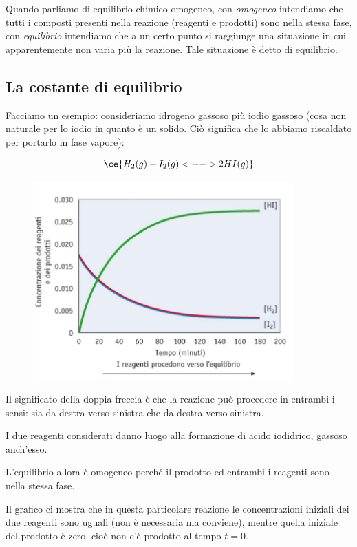 Quando parliamo di equilibrio chimico omogeneo, con \textit{omogeneo} intendiamo che tutti i composti presenti nella reazione (reagenti e prodotti) sono nella stessa fase, con \textit{equilibrio} intendiamo che a un certo punto si raggiunge una situazione in cui apparentemente non varia più la reazione. Tale situazione è detto di equilibrio.
\subsection{La costante di equilibrio}
\vspace{0.2cm}Facciamo un esempio: consideriamo idrogeno gassoso più iodio gassoso (cosa non naturale per lo iodio in quanto è un solido. Ciò significa che lo abbiamo riscaldato per portarlo in fase vapore):

$$\ce{H_2(g) + I_2(g) <--> 2HI(g)}$$
\vspace{-1cm}\begin{figure}[htp]
    \centering
    \includegraphics[width=10cm]{immagini/equilibrio_chimico.png}
\end{figure}

Il significato della doppia freccia è che la reazione può procedere in entrambi i sensi: sia da destra verso sinistra che da destra verso sinistra.

I due reagenti considerati danno luogo alla formazione di acido iodidrico, gassoso anch'esso.

L'equilibrio allora è omogeneo perché il prodotto ed entrambi i reagenti sono nella stessa fase.

Il grafico ci mostra che in questa particolare reazione le concentrazioni iniziali dei due reagenti sono uguali (non è necessaria ma conviene), mentre quella iniziale del prodotto è zero, cioè non c'è prodotto al tempo $t=0$.

